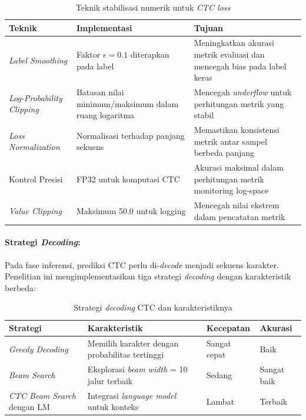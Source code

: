 \documentclass[12pt,a4paper]{article}
\begin{document}
\begin{table}[H]
\centering
\caption{Teknik stabilisasi numerik untuk \textit{CTC loss}}
\label{tab:ctc-stabilization}
\small
\begin{tabular}{|l|p{4.5cm}|p{6cm}|}
\hline
\textbf{Teknik} & \textbf{Implementasi} & \textbf{Tujuan} \\ \hline
\textit{Label Smoothing} & Faktor $\epsilon = 0.1$ diterapkan pada label & Meningkatkan akurasi metrik evaluasi dan mencegah bias pada label keras \\ \hline
\textit{Log-Probability Clipping} & Batasan nilai minimum/maksimum dalam ruang logaritma & Mencegah \textit{underflow} untuk perhitungan metrik yang stabil \\ \hline
\textit{Loss Normalization} & Normalisasi terhadap panjang sekuens & Memastikan konsistensi metrik antar sampel berbeda panjang \\ \hline
Kontrol Presisi & FP32 untuk komputasi CTC & Akurasi maksimal dalam perhitungan metrik monitoring log-space \\ \hline
\textit{Value Clipping} & Maksimum 50.0 untuk logging & Mencegah nilai ekstrem dalam pencatatan metrik \\ \hline
\end{tabular}
\end{table}

\paragraph{Strategi \textit{Decoding}:}
Pada fase inferensi, prediksi CTC perlu di-\textit{decode} menjadi sekuens karakter. Penelitian ini mengimplementasikan tiga strategi \textit{decoding} dengan karakteristik berbeda:

\begin{table}[H]
\centering
\caption{Strategi \textit{decoding} CTC dan karakteristiknya}
\label{tab:ctc-decoding}
\small
\begin{tabular}{|l|p{4cm}|p{3.5cm}|p{3cm}|}
\hline
\textbf{Strategi} & \textbf{Karakteristik} & \textbf{Kecepatan} & \textbf{Akurasi} \\ \hline
\textit{Greedy Decoding} & Memilih karakter dengan probabilitas tertinggi & Sangat cepat & Baik \\ \hline
\textit{Beam Search} & Eksplorasi \textit{beam width} = 10 jalur terbaik & Sedang & Sangat baik \\ \hline
\textit{CTC Beam Search} dengan LM & Integrasi \textit{language model} untuk konteks & Lambat & Terbaik \\ \hline
\end{tabular}
\end{table}
\end{document}
